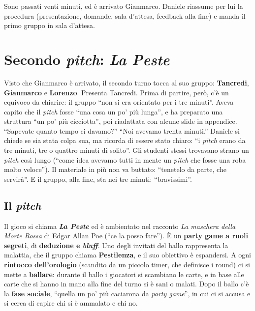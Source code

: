 Sono passati venti minuti, ed è arrivato Gianmarco. Daniele riassume per lui la
procedura (presentazione, domande, sala d'attesa, feedback alla fine) e manda il primo
gruppo in sala d'attesa.

\section{Secondo \emph{pitch}: \emph{La Peste}}
\label{a11:sec:peste}

Visto che Gianmarco è arrivato, il secondo turno tocca al suo gruppo: \textbf{Tancredi},
\textbf{Gianmarco} e \textbf{Lorenzo}. Presenta Tancredi. Prima di partire, però, c'è un
equivoco da chiarire: il gruppo ``non si era orientato per i tre minuti''. Aveva capito
che il \emph{pitch} fosse ``una cosa un po' più lunga'', e ha preparato una struttura ``un
po' più cicciotta'', poi riadattata con alcune slide in appendice. ``Sapevate quanto tempo
ci davamo?'' ``Noi avevamo trenta minuti.'' Daniele si chiede se sia stata colpa sua, ma
ricorda di essere stato chiaro: ``i \emph{pitch} erano da tre minuti, tre o quattro minuti
di solito''. Gli studenti stessi trovavano strano un \emph{pitch} così lungo (``come idea
avevamo tutti in mente un \emph{pitch} che fosse una roba molto veloce''). Il materiale in
più non va buttato: ``tenetelo da parte, che servirà''. E il gruppo, alla fine, sta nei
tre minuti: ``bravissimi''.

\subsection{Il \emph{pitch}}

Il gioco si chiama \textbf{\emph{La Peste}} ed è ambientato nel racconto \emph{La
maschera della Morte Rossa} di Edgar Allan Poe (``ce la posso fare''). È un \textbf{party
game a ruoli segreti}, di \textbf{deduzione e \emph{bluff}}. Uno degli invitati del ballo
rappresenta la malattia, che il gruppo chiama \textbf{Pestilenza}, e il suo obiettivo è
espandersi. A ogni \textbf{rintocco dell'orologio} (scandito da un piccolo timer, che
definisce i round) ci si mette a \textbf{ballare}: durante il ballo i giocatori si
scambiano le carte, e in base alle carte che si hanno in mano alla fine del turno si è
sani o malati. Dopo il ballo c'è la \textbf{fase sociale}, ``quella un po' più caciarona
da \emph{party game}'', in cui ci si accusa e si cerca di capire chi si è ammalato e chi
no.

